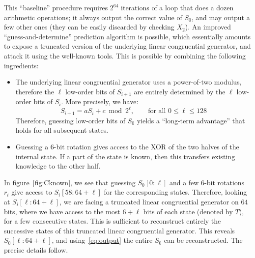 \documentclass[submission,svgnames,journal=tosc]{iacrtrans}
\begin{document}
This ``baseline'' procedure requires $2^{64}$ iterations of a loop that does a
dozen arithmetic operations; it always output the correct value of $S_0$, and
may output a few other ones (they can be easily discarded by checking $X_2$). An
improved ``guess-and-determine'' prediction algorithm is possible, which
essentially amounts to expose a truncated version of the underlying linear
congruential generator, and attack it using the well-known tools. This is
possible by combining the following ingredients:
\begin{itemize}
\item The underlying linear congruential generator uses a power-of-two modulus,
  therefore the $\ell$ low-order bits of $S_{i+1}$ are entirely determined by
  the $\ell$ low-order bits of $S_i$. More precisely, we have:
  \begin{equation}\label{eq:lcg}
    S_{i+1} = aS_i + c \bmod 2^\ell, \qquad \text{for all } 0 \leq \ell \leq 128
  \end{equation}
  Therefore, guessing low-order bits of $S_0$ yields a ``long-term advantage''
  that holds for all subsequent states.

\item Guessing a 6-bit rotation gives access to the XOR of the two halves of the
  internal state. If a part of the state is known, then this transfers existing
  knowledge to the other half.
\end{itemize}

In figure~\ref{fig:Cknown}, we see that guessing $S_0[0:\ell]$ and a few 6-bit
rotations $r_i$ give access to $S_i[58:64+\ell]$ for the corresponding
states. Therefore, looking at $S_i[\ell:64+\ell]$, we are facing a truncated
linear congruential generator on $64$ bits, where we have access to the most
$6+\ell$ bits of each state (denoted by $T$), for a few consecutive states. This
is sufficient to reconstruct entirely the successive states of this truncated
linear congruential generator. This reveals $S_0[\ell:64+\ell]$, and
using~\eqref{eq:output} the entire $S_0$ can be reconstructed. The precise
details follow.
\end{document}
